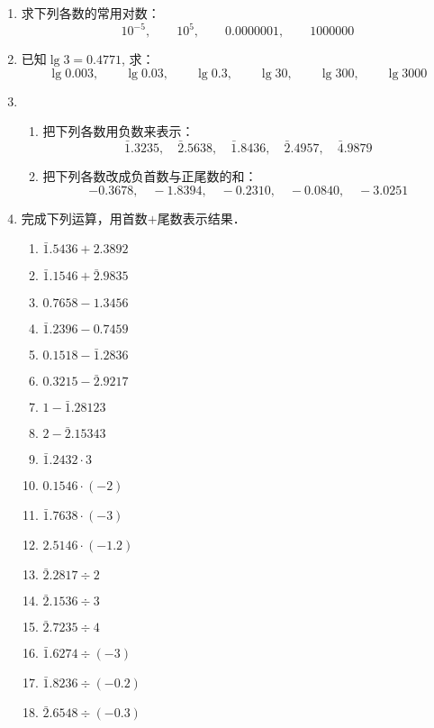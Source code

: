 \begin{ex}
\begin{enumerate}
    \item 求下列各数的常用对数：
\[10^{-5},\qquad 10^5,\qquad 0.0000001,\qquad 1000000\]

\item 已知$\lg 3=0.4771$, 求：
\[\lg0.003,\qquad \lg0.03,\qquad \lg0.3,\qquad \lg30,\qquad \lg300,\qquad \lg3000\]

\item \begin{enumerate}
    \item 把下列各数用负数来表示：
    \[\bar{1}.3235,\quad \bar{2}.5638,\quad \bar{1}.8436,\quad \bar{2}.4957,\quad \bar{4}.9879\]
    \item 把下列各数改成负首数与正尾数的和：
    \[-0.3678,\quad-1.8394,\quad-0.2310,\quad-0.0840,\quad-3.0251\]
\end{enumerate}

\item  完成下列运算，用首数$+$尾数表示结果．
\begin{multicols}{2}
\begin{enumerate}
    \item $\bar{1}.5436+2.3892$
    \item $\bar{1}.1546+\bar{2}.9835$
    \item $0.7658-1.3456$
    \item $\bar{1}.2396-0.7459$
    \item $0.1518-\bar{1}.2836$
    \item $0.3215-\bar{2}.9217$
    \item $1-\bar{1}.28123$
    \item $2-\bar{2}.15343$
    \item $\bar{1}.2432\cdot 3$
    \item $0.1546\cdot (-2)$
    \item $\bar{1}.7638\cdot (-3)$
    \item $2.5146\cdot (-1.2)$
    \item $\bar{2}.2817\div 2$
    \item $\bar{2}.1536\div 3$
    \item $\bar{2}.7235\div 4$
    \item $\bar{1}.6274\div (-3)$
    \item $\bar{1}.8236\div (-0.2)$
    \item $\bar{2}.6548\div (-0.3)$  
\end{enumerate}
\end{multicols}


\end{enumerate}
\end{ex}
